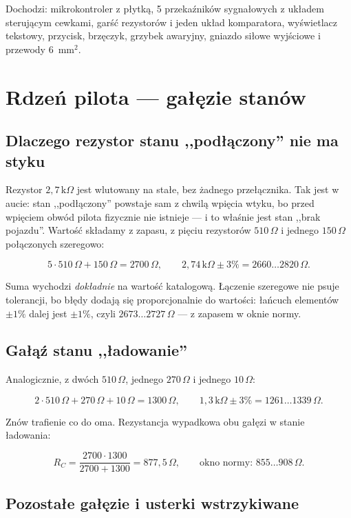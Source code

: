 \documentclass[a4paper,11pt]{article}
\newcommand{\ohm}{\,\Omega}
\newcommand{\kohm}{\,\mathrm{k}\Omega}
\begin{document}
\noindent Dochodzi: mikrokontroler z płytką, 5 przekaźników sygnałowych z układem
sterującym cewkami, garść rezystorów i jeden układ komparatora, wyświetlacz
tekstowy, przycisk, brzęczyk, grzybek awaryjny, gniazdo siłowe wyjściowe i przewody
$6$~mm$^2$.

\section{Rdzeń pilota --- gałęzie stanów}

\subsection{Dlaczego rezystor stanu ,,podłączony'' nie ma styku}

Rezystor $2{,}7\kohm$ jest wlutowany na stałe, bez żadnego przełącznika. Tak jest
w aucie: stan ,,podłączony'' powstaje sam z chwilą wpięcia wtyku, bo przed wpięciem
obwód pilota fizycznie nie istnieje --- i to właśnie jest stan ,,brak pojazdu''.
Wartość składamy z zapasu, z pięciu rezystorów $510\ohm$ i jednego $150\ohm$
połączonych szeregowo:

\[
5\cdot510\ohm+150\ohm=2700\ohm ,
\qquad
2{,}74\kohm\pm3\%=2660\ldots2820\ohm .
\]

Suma wychodzi \emph{dokładnie} na wartość katalogową. Łączenie szeregowe nie psuje
tolerancji, bo błędy dodają się proporcjonalnie do wartości: łańcuch elementów
$\pm1\%$ dalej jest $\pm1\%$, czyli $2673\ldots2727\ohm$ --- z zapasem w oknie normy.

\subsection{Gałąź stanu ,,ładowanie''}

Analogicznie, z dwóch $510\ohm$, jednego $270\ohm$ i jednego $10\ohm$:

\[
2\cdot510\ohm+270\ohm+10\ohm=1300\ohm ,
\qquad
1{,}3\kohm\pm3\%=1261\ldots1339\ohm .
\]

Znów trafienie co do oma. Rezystancja wypadkowa obu gałęzi w stanie ładowania:

\[
R_C=\frac{2700\cdot1300}{2700+1300}=877{,}5\ohm ,
\qquad
\text{okno normy: } 855\ldots908\ohm .
\]

\subsection{Pozostałe gałęzie i usterki wstrzykiwane}
\end{document}

